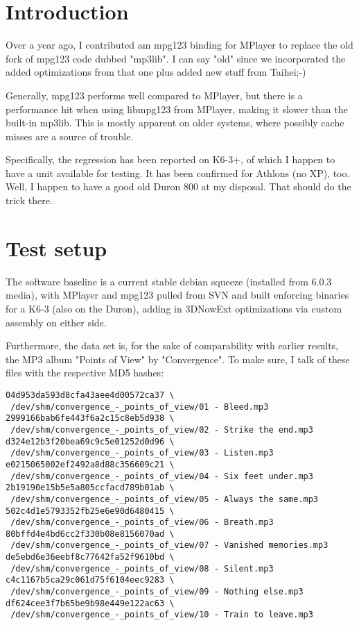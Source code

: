 \documentclass[a4paper,12pt]{scrartcl}
\begin{document}
\setlength{\parindent}{0pt}
\setlength{\parskip}{0.5em}

\section{Introduction}

Over a year ago, I contributed am mpg123 binding for MPlayer to replace the old fork of mpg123 code dubbed "mp3lib". I can say "old" since we incorporated the added optimizations from that one plus added new stuff from Taihei;-)

Generally, mpg123 performs well compared to MPlayer, but there is a performance hit when using libmpg123 from MPlayer, making it slower than the built-in mp3lib. This is mostly apparent on older systems, where possibly cache misses are a source of trouble.

Specifically, the regression has been reported on K6-3+, of which I happen to have a unit available for testing. It has been confirmed for Athlons (no XP), too. Well, I happen to have a good old Duron 800 at my disposal. That should do the trick there.

\section{Test setup}

The software baseline is a current stable debian squeeze (installed from 6.0.3 media), with MPlayer and mpg123 pulled from SVN and built enforcing binaries for a K6-3 (also on the Duron), adding in 3DNowExt optimizations via custom assembly on either side.

Furthermore, the data set is, for the sake of comparability with earlier results, the MP3 album "Points of View" by "Convergence". To make sure, I talk of these files with the respective MD5 hashes:

\begin{verbatim}
04d953da593d8cfa43aee4d00572ca37 \
 /dev/shm/convergence_-_points_of_view/01 - Bleed.mp3
2999166bab6fe443f6a2c15c8eb5d938 \
 /dev/shm/convergence_-_points_of_view/02 - Strike the end.mp3
d324e12b3f20bea69c9c5e01252d0d96 \
 /dev/shm/convergence_-_points_of_view/03 - Listen.mp3
e0215065002ef2492a8d88c356609c21 \
 /dev/shm/convergence_-_points_of_view/04 - Six feet under.mp3
2b19190e15b5e5a805ccfacd789b01ab \
 /dev/shm/convergence_-_points_of_view/05 - Always the same.mp3
502c4d1e5793352fb25e6e90d6480415 \
 /dev/shm/convergence_-_points_of_view/06 - Breath.mp3
80bffd4e4bd6cc2f330b08e8156070ad \
 /dev/shm/convergence_-_points_of_view/07 - Vanished memories.mp3
de5ebd6e36eebf8c77642fa52f9610bd \
 /dev/shm/convergence_-_points_of_view/08 - Silent.mp3
c4c1167b5ca29c061d75f6104eec9283 \
 /dev/shm/convergence_-_points_of_view/09 - Nothing else.mp3
df624cee3f7b65be9b98e449e122ac63 \
 /dev/shm/convergence_-_points_of_view/10 - Train to leave.mp3
\end{verbatim}
\end{document}
